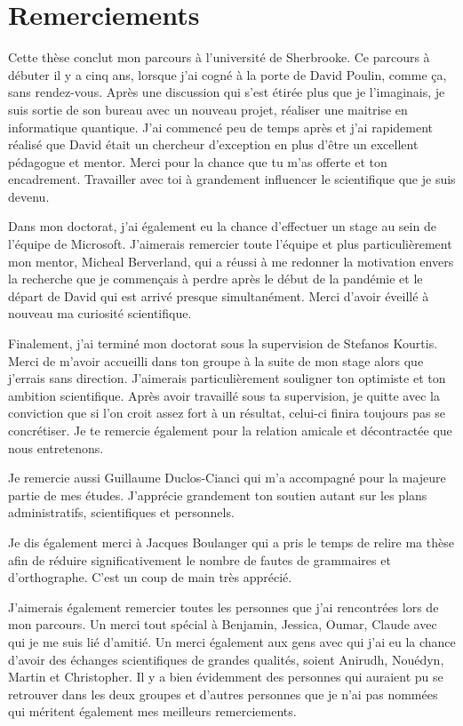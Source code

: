 \begin{comment}
\end{comment}

\chapter*{Remerciements}

Cette thèse conclut mon parcours à l'université de Sherbrooke.
Ce parcours à débuter il y a cinq ans,
lorsque j'ai cogné à la porte de David Poulin,
comme ça, sans rendez-vous.
Après une discussion qui s'est étirée plus que je l'imaginais,
je suis sortie de son bureau avec un nouveau projet, 
réaliser une maitrise en informatique quantique.
J'ai commencé peu de temps après et j'ai rapidement réalisé que David 
était un chercheur d'exception en plus d'être un excellent pédagogue et mentor.
Merci pour la chance que tu m'as offerte et ton encadrement.
Travailler avec toi à grandement influencer le scientifique que je suis devenu.

Dans mon doctorat,
j'ai également eu la chance d'effectuer un stage au sein de l'équipe de Microsoft.
J'aimerais remercier toute l'équipe et plus particulièrement mon mentor,
Micheal Berverland, qui a réussi à me redonner la motivation envers la recherche
que je commençais à perdre après le début de la pandémie et le départ de David qui est
arrivé presque simultanément.
Merci d'avoir éveillé à nouveau ma curiosité scientifique.

Finalement,
j'ai terminé mon doctorat sous la supervision de Stefanos Kourtis.
Merci de m'avoir accueilli dans ton groupe à la suite de mon stage alors que j'errais sans direction.
J'aimerais particulièrement souligner ton optimiste et ton ambition scientifique.
Après avoir travaillé sous ta supervision,
je quitte avec la conviction que si l'on croit assez fort à un résultat,
celui-ci finira toujours pas se concrétiser.
Je te remercie également pour la relation amicale et décontractée que nous entretenons.

Je remercie aussi Guillaume Duclos-Cianci qui m'a accompagné pour la majeure partie de mes études.
J'apprécie grandement ton soutien autant sur les plans administratifs, 
scientifiques et personnels.

Je dis également merci à Jacques Boulanger qui a pris le temps de relire ma thèse afin de réduire
significativement le nombre de fautes de grammaires et d'orthographe. C'est un coup de main très apprécié.  

J'aimerais également remercier toutes les personnes que j'ai rencontrées lors de mon parcours.
Un merci tout spécial à Benjamin, Jessica, Oumar, Claude avec qui
je me suis lié d'amitié.
Un merci également aux gens avec qui j'ai eu la chance d'avoir des échanges scientifiques
de grandes qualités, soient Anirudh, Nouédyn, Martin et Christopher.
Il y a bien évidemment des personnes qui auraient pu se retrouver dans les deux groupes
et d'autres personnes que je n'ai pas nommées qui méritent également mes meilleurs remerciements. 

